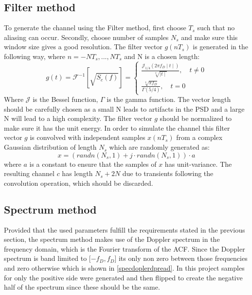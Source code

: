 \documentclass[conference]{IEEEtran}
\begin{document}
\subsection{Filter method}
To generate the channel using the Filter method, first choose $T_s$ such that no aliasing can occur. Secondly, choose number of samples $N_s$ and make sure this window size gives a good resolution. The filter vector $g(nT_{s})$ is generated in the following way, where  $n = -NT_s,...,NT_s$ and N is a chosen length:
\begin{equation}
   g(t)  = \mathcal{F}^{-1}[\sqrt{S_{c}(f)}] =
\begin{cases}
    \frac{\mathcal{J}_{1/4}(2\pi f_{D}\mid t \mid)}{\sqrt[4]{\mid t \mid}},\quad t\neq0\\
    \frac{\sqrt[4]{\pi f_{D}}}{\Gamma(5/4)},\quad t = 0
\end{cases}
\end{equation}
Where $\mathcal{J}$ is the Bessel function, $\Gamma$ is the gamma function. The vector length should be carefully chosen as a small N leads to artifacts in the PSD and a large N will lead to a high complexity. The filter vector $g$ should be normalized to make sure it has the unit energy.  In order to simulate the channel this filter vector $g$ is convolved with independent samples $x(nT_{s})$ from a complex Gaussian distribution of length $N_{s}$ which are randomly generated as: 
\begin{equation}
    x = (randn(N_s,1) + j\cdot randn(N_s,1))\cdot a
    \label{randn}
\end{equation}
where $a$ is a constant to ensure that the samples of $x$ has unit-variance. The resulting channel $c$ has length $N_s+2N$ due to transients following the convolution operation, which should be discarded.

\subsection{Spectrum method}

Provided that the used parameters fulfill the requirements stated in the previous section, the spectrum method makes use of the Doppler spectrum in the frequency domain, which is the Fourier transform of the ACF. Since the Doppler spectrum is band limited to [$-f_D, f_D$] its only non zero between those frequencies and zero otherwise which is shown in \ref{specdoplerdpread}. In this project samples for only the positive side were generated and then flipped to create the negative half of the spectrum since these should be the same. 
\end{document}
